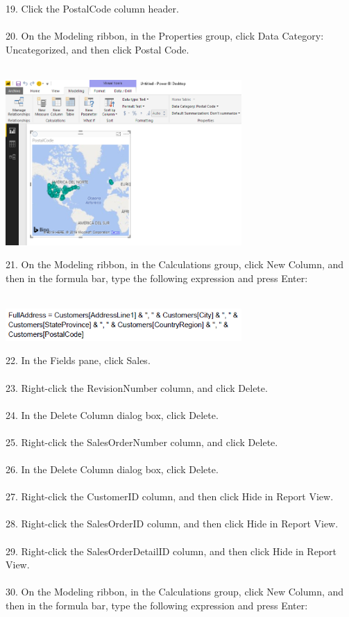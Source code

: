 \documentclass[12pt,letterpaper]{article}
\begin{document}
19. Click the PostalCode column header.\\\\
20. On the Modeling ribbon, in the Properties group, click Data Category: Uncategorized, and then click Postal Code.\\\\
\begin{center}
\includegraphics[width=9cm]{IMG/10.png} 
\end{center}
21. On the Modeling ribbon, in the Calculations group, click New Column, and then in the formula bar, type the following expression and press Enter:\\\\
\begin{center}
\includegraphics[width=9cm]{IMG/1.png} 
\end{center}
22. In the Fields pane, click Sales.\\\\
23. Right-click the RevisionNumber column, and click Delete.\\\\
24. In the Delete Column dialog box, click Delete.\\\\
25. Right-click the SalesOrderNumber column, and click Delete.\\\\
26. In the Delete Column dialog box, click Delete.\\\\
27. Right-click the CustomerID column, and then click Hide in Report View.\\\\
28. Right-click the SalesOrderID column, and then click Hide in Report View.\\\\
29. Right-click the SalesOrderDetailID column, and then click Hide in Report View.\\\\
30. On the Modeling ribbon, in the Calculations group, click New Column, and then in the formula bar, type the following expression and press Enter:\\\\
\end{document}
